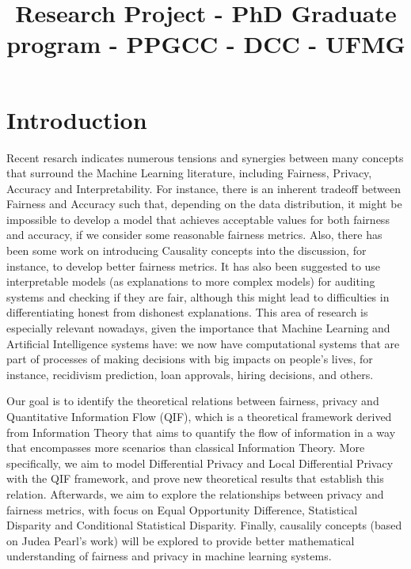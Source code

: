 \documentclass[12pt]{article}
\title{\Huge Research Project - PhD Graduate program - PPGCC - DCC - UFMG}
\date{}
\begin{document}
\maketitle
\vspace{-8em}

\section{Introduction}

Recent resarch\cite{Sok}\cite{Reductions}\cite{Rachel}\cite{Awareness} indicates numerous tensions and synergies between many concepts that surround the Machine Learning literature, including Fairness, Privacy, Accuracy and Interpretability. For instance, there is an inherent tradeoff between Fairness and Accuracy such that, depending on the data distribution, it might be impossible to develop a model that achieves acceptable values for both fairness and accuracy, if we consider some reasonable fairness metrics\cite{Carlos}. Also, there has been some work on introducing Causality concepts into the discussion, for instance, to develop better fairness metrics\cite{CausalFair}. It has also been suggested to use interpretable models (as explanations to more complex models) for auditing systems and checking if they are fair, although this might lead to difficulties in differentiating honest from dishonest explanations\cite{ExplainAll}. This area of research is especially relevant nowadays, given the importance that Machine Learning and Artificial Intelligence systems have: we now have computational systems that are part of processes of making decisions with big impacts on people's lives, for instance, recidivism prediction\cite{Compass}, loan approvals\cite{Loans}, hiring decisions\cite{Jobs}, and others.

Our goal is to identify the theoretical relations between fairness, privacy and Quantitative Information Flow (QIF), which is a theoretical framework derived from Information Theory\cite{smith2009foundations} that aims to quantify the flow of information in a way that encompasses more scenarios than classical Information Theory. More specifically, we aim to model Differential Privacy and Local Differential Privacy with the QIF framework, and prove new theoretical results that establish this relation. Afterwards, we aim to explore the relationships between privacy and fairness metrics, with focus on Equal Opportunity Difference, Statistical Disparity and Conditional Statistical Disparity. Finally, causalily concepts (based on Judea Pearl's work\cite{Causality}) will be explored to provide better mathematical understanding of fairness and privacy in machine learning systems.
\end{document}
